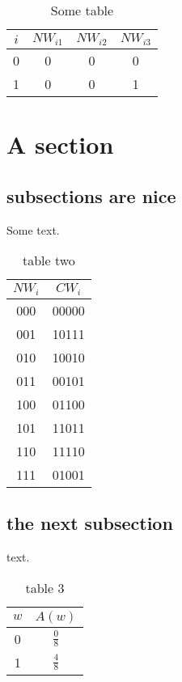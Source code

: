 \documentclass[a4paper,10pt]{article}
\begin{document}
\begin{wraptable}{r}{1cm}
  \centering
  \begin{tabular}{|c|c|c|c|}
    \hline
    $i$ & $NW_{i1}$ & $NW_{i2}$ & $NW_{i3}$ \\\hline\hline
    0 & 0 & 0 & 0 \\\hline
    1 & 0 & 0 & 1 \\\hline

  \end{tabular}
  \caption{Some table}
\end{wraptable}

\section*{A section}
\subsection*{subsections are nice}
Some text.

\begin{wraptable}{l}{5cm}
  \centering
  \begin{tabular}{|c|c|}
    \hline
    $NW_i$ & $CW_i$ \\\hline\hline
    000 & 00000 \\\hline
    001 & 10111 \\\hline
    010 & 10010 \\\hline
    011 & 00101 \\\hline
    100 & 01100 \\\hline
    101 & 11011 \\\hline
    110 & 11110 \\\hline
    111 & 01001 \\\hline
  \end{tabular}
  \caption{table two}
\end{wraptable}


\subsection*{the next subsection}
text.

\begin{wraptable}{r}{8cm}
  \centering
  \begin{tabular}{|c|c|}
    \hline
    $w$ & $A(w)$ \\\hline\hline
    0 & $\frac{0}{8}$ \\\hline
    1 & $\frac{4}{8}$ \\\hline

  \end{tabular}
  \caption{table 3}
\end{wraptable}
\end{document}
